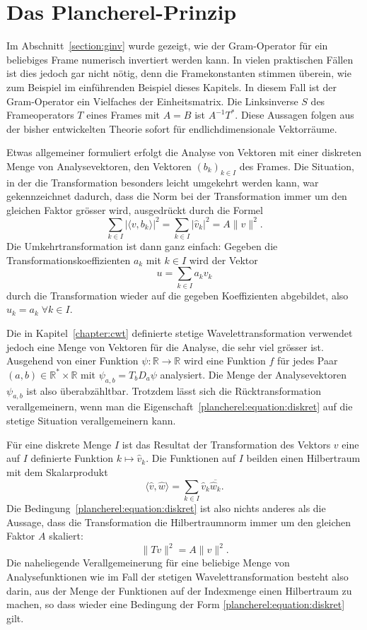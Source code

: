 %
%
%
\section{Das Plancherel-Prinzip
\label{section:plancherel}}
Im Abschnitt~\ref{section:ginv} wurde gezeigt, wie der Gram-Operator
für ein beliebiges Frame numerisch invertiert werden kann.
In vielen praktischen Fällen ist dies jedoch gar nicht nötig, denn
die Framekonstanten stimmen überein, wie zum Beispiel im einführenden
Beispiel dieses Kapitels.
In diesem Fall ist der Gram-Operator ein Vielfaches der Einheitsmatrix.
Die Linksinverse $S$ des Frameoperators $T$ eines Frames mit $A=B$
ist $A^{-1}T^*$.
Diese Aussagen folgen aus der bisher entwickelten Theorie sofort
für endlichdimensionale Vektorräume.

Etwas allgemeiner formuliert erfolgt die Analyse von Vektoren
mit einer diskreten Menge von Analysevektoren, den Vektoren $(b_k)_{k\in I}$
des Frames.
Die Situation, in der die Transformation besonders leicht umgekehrt werden
kann, war gekennzeichnet dadurch, dass die Norm bei der Transformation
immer um den gleichen Faktor grösser wird,
ausgedrückt durch die Formel
\begin{equation}
\sum_{k\in I} |\langle v,b_k\rangle|^2
=
\sum_{k\in I} |\hat{v}_k|^2
=
A\| v\|^2.
\label{plancherel:equation:diskret}
\end{equation}
Die Umkehrtransformation ist dann ganz einfach:
Gegeben die Transformationskoeffizienten $a_k$ mit $k\in I$ wird der Vektor
\[
u = \sum_{k\in I} a_k v_k
\]
durch die Transformation wieder auf die gegeben Koeffizienten abgebildet,
also $\hat{u}_k = a_k\;\forall k\in I$.

Die in Kapitel~\ref{chapter:cwt} definierte stetige Wavelettransformation
verwendet jedoch eine Menge von Vektoren für die Analyse, die sehr viel
grösser ist.
Ausgehend von einer Funktion $\psi\colon\mathbb R\to\mathbb R$
wird eine Funktion $f$ für jedes Paar
$(a,b)\in \mathbb{R}^*\times \mathbb R$ mit
$\psi_{a,b}=T_bD_a\psi$ analysiert.
Die Menge der Analysevektoren $\psi_{a,b}$ ist also überabzähltbar.
Trotzdem lässt sich die Rücktransformation verallgemeinern, wenn 
man die Eigenschaft~\eqref{plancherel:equation:diskret} auf die
stetige Situation verallgemeinern kann.

Für eine diskrete Menge $I$ ist das Resultat der Transformation des Vektors
$v$ eine auf $I$ definierte Funktion $k\mapsto \hat{v}_k$.
Die Funktionen auf $I$ beilden einen Hilbertraum mit dem Skalarprodukt
\[
\langle \hat{v},\hat{w}\rangle
=
\sum_{k\in I} \hat{v}_k \overline{\hat{w}_k}.
\]
Die Bedingung~\eqref{plancherel:equation:diskret} ist also nichts anderes
als die Aussage, dass die Transformation die Hilbertraumnorm immer um
den gleichen Faktor $A$ skaliert:
\[
\| Tv \|^2 = A \| v\|^2.
\]
Die naheliegende Verallgemeinerung für eine beliebige Menge von
Analysefunktionen wie im Fall der stetigen Wavelettransformation
besteht also darin, aus der Menge der Funktionen auf der Indexmenge
einen Hilbertraum zu machen, so dass wieder eine Bedingung der Form
\eqref{plancherel:equation:diskret} gilt.

